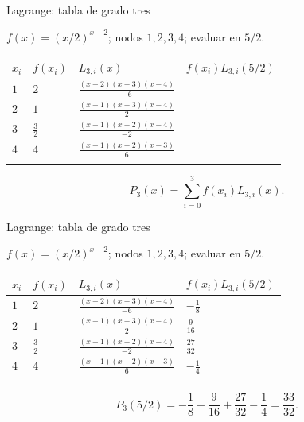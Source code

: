 \documentclass[original_version/main.tex]{subfiles}
\begin{document}
\begin{frame}[t]{Lagrange: tabla de grado tres}
\par\noindent\begin{minipage}[t][12mm][t]{\textwidth}\small\strut $f(x)=(x/2)^{x-2}$; nodos $1,2,3,4$; evaluar en $5/2$.\end{minipage}\par\nointerlineskip
\begingroup\scriptsize\setlength{\tabcolsep}{3pt}\begin{center}\begin{tabular}{|C{.06\textwidth}|C{.10\textwidth}|C{.48\textwidth}|C{.20\textwidth}|}\hline
\rule[-2mm]{0pt}{6mm}$x_i$&$f(x_i)$&$L_{3,i}(x)$&$f(x_i)L_{3,i}(5/2)$\\\hline
\rule[-2.5mm]{0pt}{7mm}$1$&$2$&$\frac{(x-2)(x-3)(x-4)}{-6}$&\\\hline
\rule[-2.5mm]{0pt}{7mm}$2$&$1$&$\frac{(x-1)(x-3)(x-4)}{2}$&\\\hline
\rule[-2.5mm]{0pt}{7mm}$3$&$\frac{3}{2}$&$\frac{(x-1)(x-2)(x-4)}{-2}$&\\\hline
\rule[-2.5mm]{0pt}{7mm}$4$&$4$&$\frac{(x-1)(x-2)(x-3)}{6}$&\\\hline
\rule[-2.5mm]{0pt}{7mm}&&&\\\hline
\end{tabular}\end{center}\endgroup\par
\[P_3(x)=\sum_{i=0}^3 f(x_i)L_{3,i}(x).\]
\end{frame}
\begin{frame}[t]{Lagrange: tabla de grado tres}
\par\noindent\begin{minipage}[t][12mm][t]{\textwidth}\small\strut $f(x)=(x/2)^{x-2}$; nodos $1,2,3,4$; evaluar en $5/2$.\end{minipage}\par\nointerlineskip
\begingroup\scriptsize\setlength{\tabcolsep}{3pt}\begin{center}\begin{tabular}{|C{.06\textwidth}|C{.10\textwidth}|C{.48\textwidth}|C{.20\textwidth}|}\hline
\rule[-2mm]{0pt}{6mm}$x_i$&$f(x_i)$&$L_{3,i}(x)$&$f(x_i)L_{3,i}(5/2)$\\\hline
\rule[-2.5mm]{0pt}{7mm}$1$&$2$&$\frac{(x-2)(x-3)(x-4)}{-6}$&$-\frac{1}{8}$\\\hline
\rule[-2.5mm]{0pt}{7mm}$2$&$1$&$\frac{(x-1)(x-3)(x-4)}{2}$&$\frac{9}{16}$\\\hline
\rule[-2.5mm]{0pt}{7mm}$3$&$\frac{3}{2}$&$\frac{(x-1)(x-2)(x-4)}{-2}$&$\frac{27}{32}$\\\hline
\rule[-2.5mm]{0pt}{7mm}$4$&$4$&$\frac{(x-1)(x-2)(x-3)}{6}$&$-\frac{1}{4}$\\\hline
\rule[-2.5mm]{0pt}{7mm}&&&\\\hline
\end{tabular}\end{center}\endgroup\par
\[P_3(5/2)=-\frac18+\frac9{16}+\frac{27}{32}-\frac14=\frac{33}{32}.\]
\end{frame}
\end{document}
